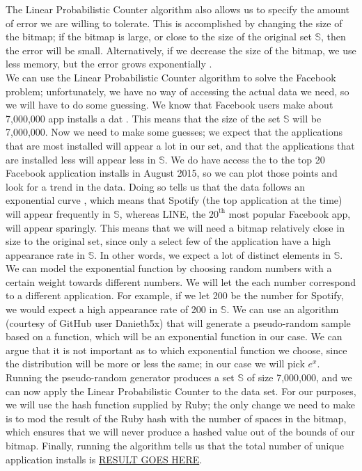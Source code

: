 \documentclass{article}
\begin{document}
\noindent The Linear Probabilistic Counter algorithm also allows us to specify the amount of error we are willing to tolerate.
This is accomplished by changing the size of the bitmap; if the bitmap is large, or close to the size of the original set $\mathbb{S}$, then the error will be small.
Alternatively, if we decrease the size of the bitmap, we use less memory, but the error grows exponentially \cite{Hoff}.\\
\indent We can use the Linear Probabilistic Counter algorithm to solve the Facebook problem; unfortunately, we have no way of accessing the actual data we need, so we will have to do some guessing. 
We know that Facebook users make about 7,000,000 app installs a dat \cite{Facebook-2}.
This means that the size of the set $\mathbb{S}$ will be 7,000,000.
Now we need to make some guesses; we expect that the applications that are most installed will appear a lot in our set, and that the applications that are installed less will appear less in $\mathbb{S}$. 
We do have access the to the top 20 Facebook application installs in August 2015, so we can plot those points and look for a trend in the data.
Doing so tells us that the data follows an exponential curve \cite{Facebook-2}, which means that Spotify (the top application at the time) will appear frequently in $\mathbb{S}$, whereas LINE, the $20^{\text{th}}$ most popular Facebook app, will appear sparingly.
This means that we will need a bitmap relatively close in size to the original set, since only a select few of the application have a high appearance rate in $\mathbb{S}$.
In other words, we expect a lot of distinct elements in $\mathbb{S}$.\\
\indent We can model the exponential function by choosing random numbers with a certain weight towards different numbers.
We will let the each number correspond to a different application.
For example, if we let 200 be the number for Spotify, we would expect a high appearance rate of 200 in $\mathbb{S}$.
We can use an algorithm (courtesy of GitHub user Danieth5x) that will generate a pseudo-random sample based on a function, which will be an exponential function in our case.
We can argue that it is not important as to which exponential function we choose, since the distribution will be more or less the same; in our case we will pick $e^{x}$.
Running the pseudo-random generator produces a set $\mathbb{S}$ of size 7,000,000, and we can now apply the Linear Probabilistic Counter to the data set.
For our purposes, we will use the hash function supplied by Ruby; the only change we need to make is to mod the result of the Ruby hash with the number of spaces in the bitmap, which ensures that we will never produce a  hashed value out of the bounds of our bitmap.
Finally, running the algorithm tells us that the total number of unique application installs is \underline{RESULT GOES HERE}.\\
\end{document}
